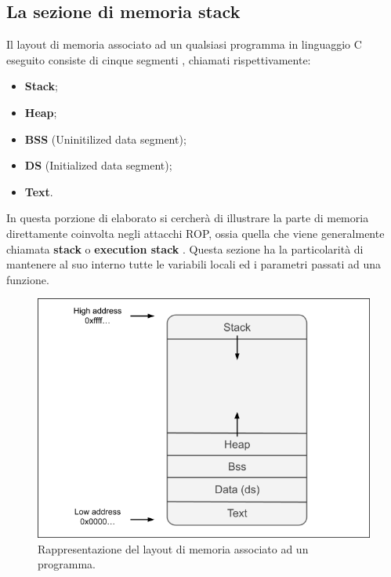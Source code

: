 \subsection{La sezione di memoria stack}
\label{subsec:stack}
Il layout di memoria associato ad un qualsiasi programma in linguaggio C eseguito consiste di cinque segmenti \cite{Memory-layout}, chiamati rispettivamente:
\begin{itemize}
    \item \textbf{Stack};
    \item \textbf{Heap};
    \item \textbf{BSS} (Uninitilized data segment);
    \item \textbf{DS} (Initialized data segment);
    \item \textbf{Text}.
\end{itemize} 
In questa porzione di elaborato si cercherà di illustrare la parte di memoria direttamente coinvolta negli attacchi ROP, ossia quella che viene generalmente
chiamata \textbf{stack} o \textbf{execution stack} \cite*{Stack-general}. Questa sezione ha la particolarità di mantenere al suo interno tutte le variabili locali ed i parametri
passati ad una funzione.

\begin{figure}[htbp]
    \centerline{\includegraphics[scale=.5]{images/memory-layout.png}}
    \caption{Rappresentazione del layout di memoria associato ad un programma.}
    \label{fig:memory-layout}
\end{figure}

